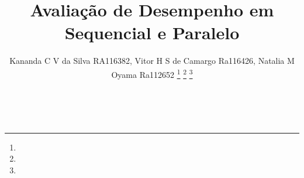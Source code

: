 \documentclass[journal, twoside]{IEEEtran}
\begin{document}
 

 \setcounter{page}{0}%
%
\title{Avaliação de Desempenho em Sequencial e Paralelo}
%
%
%

\author{Kananda C V da Silva RA116382, Vitor H S de Camargo Ra116426, Natalia M Oyama Ra112652
\thanks{}%
\thanks{}%
\thanks{}
}







\  
% 







\end{document}
